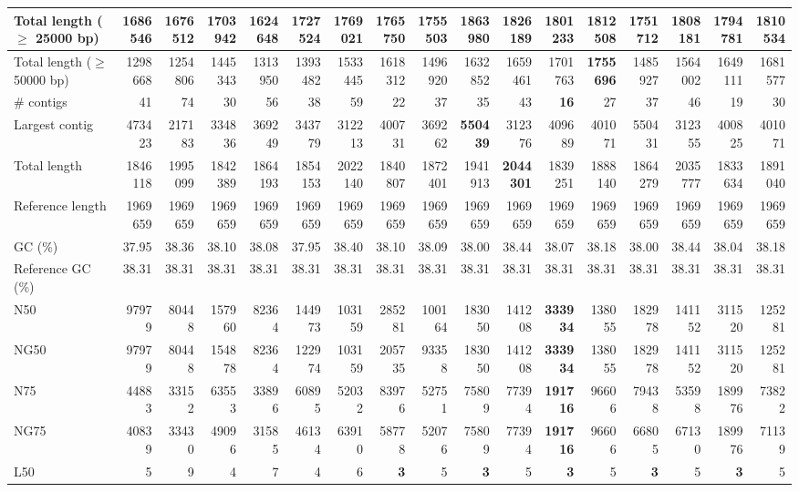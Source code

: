 \documentclass[12pt,a4paper]{article}
\begin{document}
\begin{table}[ht]
\begin{center}
\begin{tabular}{|l*{16}{|r}|}
Total length ($\geq$ 25000 bp) & 1686546 & 1676512 & 1703942 & 1624648 & 1727524 & 1769021 & 1765750 & 1755503 & {\bf 1863980} & 1826189 & 1801233 & 1812508 & 1751712 & 1808181 & 1794781 & 1810534 \\ \hline
Total length ($\geq$ 50000 bp) & 1298668 & 1254806 & 1445343 & 1313950 & 1393482 & 1533445 & 1618312 & 1496920 & 1632852 & 1659461 & 1701763 & {\bf 1755696} & 1485927 & 1564002 & 1649111 & 1681577 \\ \hline
\# contigs & 41 & 74 & 30 & 56 & 38 & 59 & 22 & 37 & 35 & 43 & {\bf 16} & 27 & 37 & 46 & 19 & 30 \\ \hline
Largest contig & 473423 & 217183 & 334836 & 369249 & 343779 & 312213 & 400731 & 369262 & {\bf 550439} & 312376 & 409689 & 401071 & 550431 & 312355 & 400825 & 401071 \\ \hline
Total length & 1846118 & 1995099 & 1842389 & 1864193 & 1854153 & 2022140 & 1840807 & 1872401 & 1941913 & {\bf 2044301} & 1839251 & 1888140 & 1864279 & 2035777 & 1833634 & 1891040 \\ \hline
Reference length & 1969659 & 1969659 & 1969659 & 1969659 & 1969659 & 1969659 & 1969659 & 1969659 & 1969659 & 1969659 & 1969659 & 1969659 & 1969659 & 1969659 & 1969659 & 1969659 \\ \hline
GC (\%) & 37.95 & 38.36 & 38.10 & 38.08 & 37.95 & 38.40 & 38.10 & 38.09 & 38.00 & 38.44 & 38.07 & 38.18 & 38.00 & 38.44 & 38.04 & 38.18 \\ \hline
Reference GC (\%) & 38.31 & 38.31 & 38.31 & 38.31 & 38.31 & 38.31 & 38.31 & 38.31 & 38.31 & 38.31 & 38.31 & 38.31 & 38.31 & 38.31 & 38.31 & 38.31 \\ \hline
N50 & 97979 & 80448 & 157960 & 82364 & 144973 & 103159 & 285281 & 100164 & 183050 & 141208 & {\bf 333934} & 138055 & 182978 & 141152 & 311520 & 125281 \\ \hline
NG50 & 97979 & 80448 & 154878 & 82364 & 122974 & 103159 & 205735 & 93358 & 183050 & 141208 & {\bf 333934} & 138055 & 182978 & 141152 & 311520 & 125281 \\ \hline
N75 & 44883 & 33152 & 63553 & 33896 & 60895 & 52032 & 83976 & 52751 & 75809 & 77394 & {\bf 191716} & 96606 & 79438 & 53598 & 189976 & 73822 \\ \hline
NG75 & 40839 & 33430 & 49096 & 31585 & 46134 & 63910 & 58778 & 52076 & 75809 & 77394 & {\bf 191716} & 96606 & 66805 & 67130 & 189976 & 71139 \\ \hline
L50 & 5 & 9 & 4 & 7 & 4 & 6 & {\bf 3} & 5 & {\bf 3} & 5 & {\bf 3} & 5 & {\bf 3} & 5 & {\bf 3} & 5 \\ \hline

\end{tabular}
\end{center}
\end{table}
\end{document}

